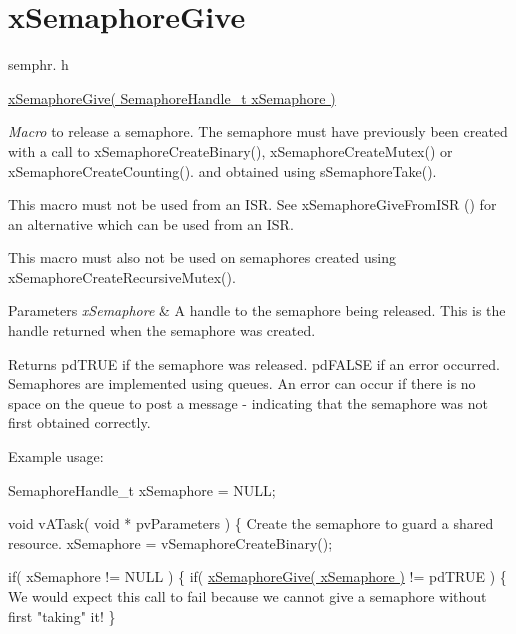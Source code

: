 \hypertarget{group__xSemaphoreGive}{\section{x\-Semaphore\-Give}
\label{group__xSemaphoreGive}
}
semphr. h 
\begin{DoxyPre}\hyperlink{semphr_8h_aae55761cabfa9bf85c8f4430f78c0953}{xSemaphoreGive( SemaphoreHandle\_t xSemaphore )}\end{DoxyPre}


{\itshape Macro} to release a semaphore. The semaphore must have previously been created with a call to x\-Semaphore\-Create\-Binary(), x\-Semaphore\-Create\-Mutex() or x\-Semaphore\-Create\-Counting(). and obtained using s\-Semaphore\-Take().

This macro must not be used from an I\-S\-R. See x\-Semaphore\-Give\-From\-I\-S\-R () for an alternative which can be used from an I\-S\-R.

This macro must also not be used on semaphores created using x\-Semaphore\-Create\-Recursive\-Mutex().


\begin{DoxyParams}{Parameters}
{\em x\-Semaphore} & A handle to the semaphore being released. This is the handle returned when the semaphore was created.\\
\hline
\end{DoxyParams}
\begin{DoxyReturn}{Returns}
pd\-T\-R\-U\-E if the semaphore was released. pd\-F\-A\-L\-S\-E if an error occurred. Semaphores are implemented using queues. An error can occur if there is no space on the queue to post a message -\/ indicating that the semaphore was not first obtained correctly.
\end{DoxyReturn}
Example usage\-: 
\begin{DoxyPre}
 SemaphoreHandle\_t xSemaphore = NULL;\end{DoxyPre}



\begin{DoxyPre} void vATask( void * pvParameters )
 \{
Create the semaphore to guard a shared resource.
    xSemaphore = vSemaphoreCreateBinary();\end{DoxyPre}



\begin{DoxyPre}    if( xSemaphore != NULL )
    \{
        if( \hyperlink{semphr_8h_aae55761cabfa9bf85c8f4430f78c0953}{xSemaphoreGive( xSemaphore )} != pdTRUE )
        \{
We would expect this call to fail because we cannot give
a semaphore without first "taking" it!
        \}\end{DoxyPre}



